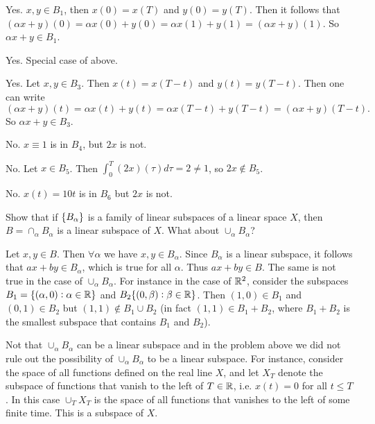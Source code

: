 \begin{solution}
	\item Yes. $ x,y\in B_1 $, then $ x(0) = x(T) $ and $ y(0) = y(T) $. Then it follows that $ (\alpha x+y)(0) = \alpha x(0) + y(0) = \alpha x(1) + y(1) = (\alpha x + y)(1) $. So $ \alpha x + y \in B_1 $.
	
	\item Yes. Special case of above.
	
	\item Yes. Let $ x,y\in B_3 $. Then $ x(t) = x(T-t) $ and $ y(t) = y(T-t) $. Then one can write
	\[ (\alpha x + y)(t) = \alpha x(t) + y(t) = \alpha x(T-t) + y(T-t) = (\alpha x+y)(T-t). \]
	So $ \alpha x + y \in B_3 $.
	
	\item No. $ x\equiv 1 $ is in $ B_4 $, but $ 2x $ is not.
	
	\item No. Let $ x\in B_5 $. Then $ \int_{0}^{T} (2x)(\tau) d\tau = 2 \neq 1$, so $ 2x \notin B_5 $.
	
	\item No.  $ x(t) = 10t $ is in $ B_6 $ but $ 2x $ is not.
\end{solution}


\begin{problem}
	\label{prob:intersectionOfSubspaces}
	Show that if $ \{B_\alpha\} $ is a family of linear subspaces of a linear space $ X $, then $ B = \cap_\alpha B_\alpha $ is a linear subspace of $ X $. What about $ \cup_\alpha B_\alpha $?
\end{problem}

\begin{solution}
	Let $ x,y \in B $. Then $ \forall \alpha $ we have $ x,y\in B_\alpha $. Since $ B_\alpha $ is a linear subspace, it follows that $ ax + by \in B_\alpha $, which is true for all $ \alpha $. Thus $ ax+by \in B $. The same is not true in the case of $ \cup_\alpha B_\alpha $. For instance in the case of $ \mathbb{R}^2 $, consider the subspaces $ B_1 = \{(\alpha,0):\alpha\in\mathbb{R}\} $ and $ B_2\{(0,\beta):\beta\in\mathbb{R}\} $. Then $ (1,0)\in B_1 $ and $ (0,1)\in B_2 $ but $ (1,1) \notin B_1\cup B_2 $ (in fact $ (1,1) \in B_1+B_2 $, where $ B_1+B_2 $ is the smallest subspace that contains $ B_1 $ and $ B_2 $).
\end{solution}
\begin{remark}
	Not that $ \cup_\alpha B_\alpha $ can be a linear subspace and in the problem above we did not rule out the possibility of $ \cup_\alpha B_\alpha $ to be a linear subspace. For instance, consider the space of all functions defined on the real line $ X $, and let $ X_T $ denote the subspace of functions that vanish to the left of $ T\in\mathbb{R} $, i.e. $ x(t) = 0 $ for all $ t\leq T $. In this case $ \cup_T X_T $ is the space of all functions that vanishes to the left of some finite time. This is a subspace of $ X $.
\end{remark}


